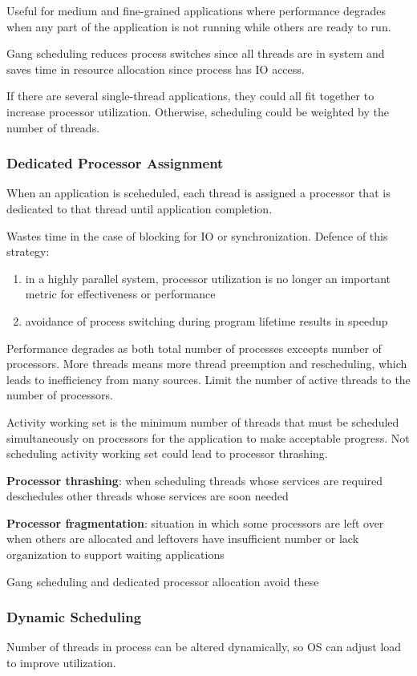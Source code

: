 \documentclass[11pt]{article}
\begin{document}
Useful for medium and fine-grained applications where performance degrades
when any part of the application is not running while others are ready
to run.

Gang scheduling reduces process switches since all threads are in system
and saves time in resource allocation since process has IO access.

If there are several single-thread applications, they could all fit together
to increase processor utilization. Otherwise, scheduling could be weighted
by the number of threads.
\subsubsection{Dedicated Processor Assignment}
\label{sec:org8fa7513}
When an application is sceheduled, each thread is assigned a processor
that is dedicated to that thread until application completion.

Wastes time in the case of blocking for IO or synchronization.
Defence of this strategy:
\begin{enumerate}
\item in a highly parallel system, processor utilization is no longer an important
metric for effectiveness or performance
\item avoidance of process switching during program lifetime results in speedup
\end{enumerate}

Performance degrades as both total number of processes exceepts number of
processors.
More threads means more thread preemption and rescheduling, which leads to
inefficiency from many sources.
Limit the number of active threads to the number of processors.

Activity working set is the minimum number of threads that must be scheduled
simultaneously on processors for the application to make acceptable progress.
Not scheduling activity working set could lead to processor thrashing.

\textbf{Processor thrashing}: when scheduling threads whose services are required
deschedules other threads whose services are soon needed

\textbf{Processor fragmentation}: situation in which some processors are left over
when others are allocated and leftovers have insufficient number or lack
organization to support waiting applications

Gang scheduling and dedicated processor allocation avoid these
\subsubsection{Dynamic Scheduling}
\label{sec:org22974e8}
Number of threads in process can be altered dynamically, so OS can adjust
load to improve utilization.
\end{document}
